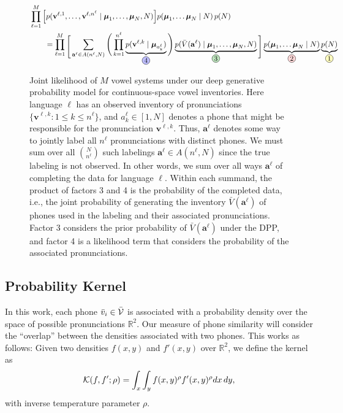 \documentclass[11pt,a4paper]{article}
\newcommand*{\numberingBlueB}[1]{%
  \protect\tikz[baseline={([yshift=-1.5pt]n.base)}]%
  \protect\node[fill=blue!25,shape=circle,inner sep=1pt,draw](n){\small #1};}
\newcommand*{\numberingRedB}[1]{%
  \protect\tikz[baseline={([yshift=-1.5pt]n.base)}]%
  \protect\node[fill=red!15 ,shape=circle,inner sep=1pt,draw](n){\small #1};}
\newcommand*{\numberingGreenB}[1]{%
  \protect\tikz[baseline={([yshift=-1.5pt]n.base)}]%
  \protect\node[fill=darkgreen!25,shape=circle,inner sep=1pt,draw](n){\small #1};}
\newcommand*{\numberingYellowB}[1]{%
  \protect\tikz[baseline={([yshift=-1.5pt]n.base)}]%
  \protect\node[fill=yellow!25,shape=circle,inner sep=1pt,draw](n){\small #1};}
\newcommand{\bigV}{{\cal V}}
\newcommand{\bigVbar}{\bar{\bigV}}
\newcommand{\Vbar}{\bar{V}}
\newcommand{\vbar}{\bar{v}}
\renewcommand{\l}{^\ell}
\newcommand{\vmu}{{\boldsymbol \mu}}
\newcommand{\vv}{{\mathbf{v}}}
\newcommand{\va}{{\mathbf{a}}}
\begin{document}
\begin{figure*}
  \centering
   \begin{align}\label{eq:likelihood}
  &\prod_{\ell=1}^M \Big[ p(\vv^{\ell,1}, \ldots, \vv^{\ell,n\l}  \mid \vmu_1, \ldots, \vmu_N, N)\mathclap{\phantom{\vv\l_1}} \Big]  p(\vmu_1, \ldots \vmu_N \mid N ) \, p(N) \\
  &\qquad = \prod_{\ell=1}^M \raisebox{-.1cm}{\Bigg[} \sum_{\va\l \in A(n\l, N)} \Bigg(\prod_{k=1}^{n\l}  \underbrace{p(\vv^{\ell,k}  \mid \vmu_{a\l_k})}_{\text{\numberingBlueB{4}}}\Bigg)  \underbrace{p(\Vbar(\va\l) \mid \vmu_1, \ldots, \vmu_N, N)}_{\numberingGreenB{3}} \raisebox{-.1cm}{\Bigg]} \underbrace{p(\vmu_1, \ldots \vmu_N \mid N)}_{\numberingRedB{2}} \underbrace{p(N)}_{\numberingYellowB{1}} \nonumber
\end{align}
\caption{Joint likelihood of $M$ vowel systems under our deep generative probability model for continuous-space vowel inventories.  Here language $\ell$ has an observed inventory of pronunciations $\{\vv^{\ell,k}: 1 \leq k \leq n\l\}$, and $a\l_k \in [1,N]$ denotes a phone that might be responsible for the pronunciation $\vv^{\ell,k}$.  Thus, $\va\l$ denotes some way to jointly label all $n\l$ pronunciations with distinct phones.  We must sum over all ${N\choose n\l}$ such labelings $\va\l \in A(n^\ell, N)$ since the true labeling is not observed.  In other words, we sum over all ways $\va\l$ of completing the data for language $\ell$.  Within each summand, the product of factors 3 and 4 is the probability of the completed data, i.e., the joint probability of generating the inventory $\Vbar(\va\l)$ of phones used in the labeling and their associated pronunciations.  Factor 3 considers the prior probability of $\Vbar(\va\l)$ under the DPP, and factor 4 is a likelihood term that considers the probability of the associated pronunciations.}
 \label{fig:likelihood}
\end{figure*}

\subsection{Probability Kernel}\label{sec:probability-kernel}
In this work, each phone $\vbar_i \in \bigVbar$ is associated with
a probability density over the space of possible pronunciations $\mathbb{R}^2$.
Our measure of phone similarity will consider the ``overlap'' between
the densities associated with two phones. This
works as follows: Given two densities $f(x,y)$
and $f'(x,y)$ over
$\mathbb{R}^2$, we define the kernel \cite{JebaraKH04} as
\begin{equation}\label{eq:probability-kernel}
  {\cal K}(f, f'; \rho) = \int_x \int_y f(x,y)^\rho f'(x,y)^\rho dx\,dy,
\end{equation}
with inverse temperature parameter $\rho$.
\end{document}
